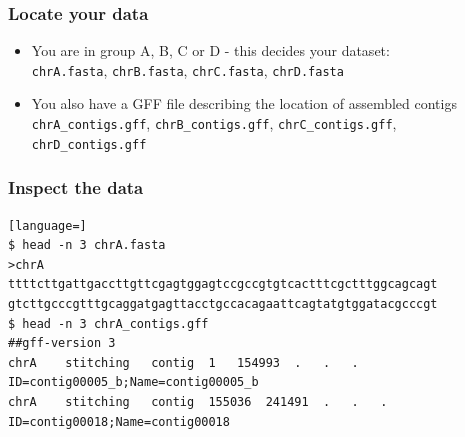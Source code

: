 \documentclass[table]{beamer}
\begin{document}
  \begin{frame}
    \frametitle{Locate your data}
    \begin{itemize}
      \item You are in group A, B, C or D - this decides your dataset: \\
      \texttt{chrA.fasta}, \texttt{chrB.fasta}, \texttt{chrC.fasta}, \texttt{chrD.fasta}
      \item You also have a GFF file describing the location of assembled contigs \\
      \texttt{chrA\_contigs.gff}, \texttt{chrB\_contigs.gff}, \texttt{chrC\_contigs.gff}, \texttt{chrD\_contigs.gff}
    \end{itemize}
  \end{frame}
  
\begin{frame}[fragile]
\frametitle{Inspect the data}
\begin{lstlisting}[language=]
$ head -n 3 chrA.fasta 
>chrA
ttttcttgattgaccttgttcgagtggagtccgccgtgtcactttcgctttggcagcagt
gtcttgcccgtttgcaggatgagttacctgccacagaattcagtatgtggatacgcccgt
$ head -n 3 chrA_contigs.gff 
##gff-version 3
chrA	stitching	contig	1	154993	.	.	.	ID=contig00005_b;Name=contig00005_b
chrA	stitching	contig	155036	241491	.	.	.	ID=contig00018;Name=contig00018
\end{lstlisting}
\end{frame}

%
\end{document}
